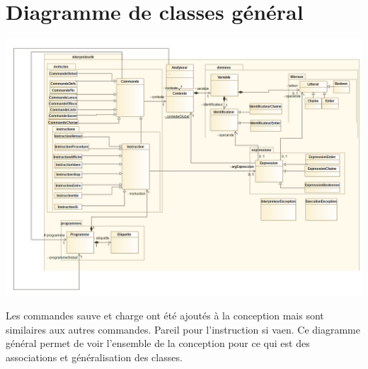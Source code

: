 \section{Diagramme de classes général}
\begin{center}\includegraphics[scale=0.35]{./img/COO/COO_prototype_3/Scéma général simplifié}\end{center}
\par Les commandes sauve et charge ont été ajoutés à la conception mais sont similaires aux autres commandes. Pareil pour l'instruction si vaen. Ce diagramme général permet de voir l'ensemble de la conception pour ce qui est des associations et généralisation des classes.